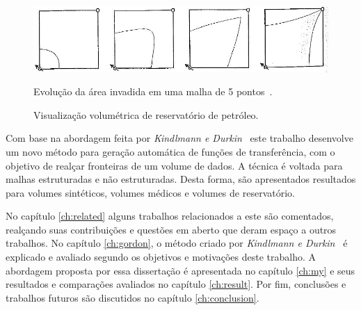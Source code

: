 \begin{figure}[h]
   	\centering
   	\includegraphics[width=1\textwidth]{images/reserv_livro}
   	\label{fig:reserv_livro}
   	\caption{Evolução da área invadida em uma malha de 5 pontos~\cite{rosa}.}
\end{figure}
    
\begin{figure}[h]
	\centering
	\label{fig:reserv}
    \caption{Visualização volumétrica de reservatório de petróleo.}
\end{figure}
    
    Com base na abordagem feita por \textit{Kindlmann e Durkin}~\cite{gordon} este trabalho desenvolve um novo método para geração automática de funções de transferência, com o objetivo de realçar fronteiras de um volume de dados. A técnica é voltada para malhas estruturadas e não estruturadas. Desta forma, são apresentados resultados para volumes sintéticos, volumes médicos e volumes de reservatório.

    No capítulo \ref{ch:related} alguns trabalhos relacionados a este são comentados, realçando suas contribuições e questões em aberto que deram espaço a outros trabalhos. No capítulo \ref{ch:gordon}, o método criado por \textit{Kindlmann e Durkin}~\cite{gordon} é explicado e avaliado segundo os objetivos e motivações deste trabalho. A abordagem proposta por essa dissertação é apresentada no capítulo \ref{ch:my} e seus resultados e comparações avaliados no capítulo \ref{ch:result}. Por fim, conclusões e trabalhos futuros são discutidos no capítulo \ref{ch:conclusion}.
